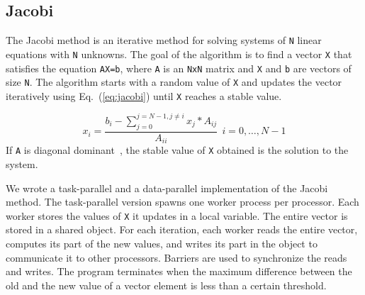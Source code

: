 \documentclass{acmtrans2e}
\begin{document}

\subsection{Jacobi}

The Jacobi method is an iterative method for solving systems of
\verb+N+ linear equations with \verb+N+ unknowns. The goal of the algorithm
is to find a vector \verb+X+ that satisfies the equation
\verb+AX=b+, where \verb+A+ is an \verb+NxN+ matrix and \verb+X+ and
\verb+b+ are vectors of size \verb+N+. The algorithm starts with a
random value of \verb+X+ and updates the vector iteratively using
Eq.~(\ref{eq:jacobi}) until \verb+X+ reaches a stable value.

\begin{equation}
x_i = \frac{b_i - \sum_{j=0}^{j=N-1,j \neq i} x_j \ast A_{ij}}{A_{ii}} 
~~i=0,\ldots,N-1 \label{eq:jacobi}
\end{equation}
If \verb+A+ is diagonal dominant~\cite{stoer83}, the stable value of
\verb+X+ obtained is the solution to the system.

We wrote a task-parallel and a data-parallel implementation of the
Jacobi method.  The task-parallel version spawns one worker process
per processor. Each worker stores the values of \verb+X+ it
updates in a local variable. The entire vector is stored in a shared
object. For each iteration, each worker reads the entire vector,
computes its part of the new values, and writes its part in the object to
communicate it to other processors.
Barriers are used to synchronize the reads and writes.
The program terminates when the maximum difference between the old and the
new value of a vector element is less than a certain threshold.
\end{document}
